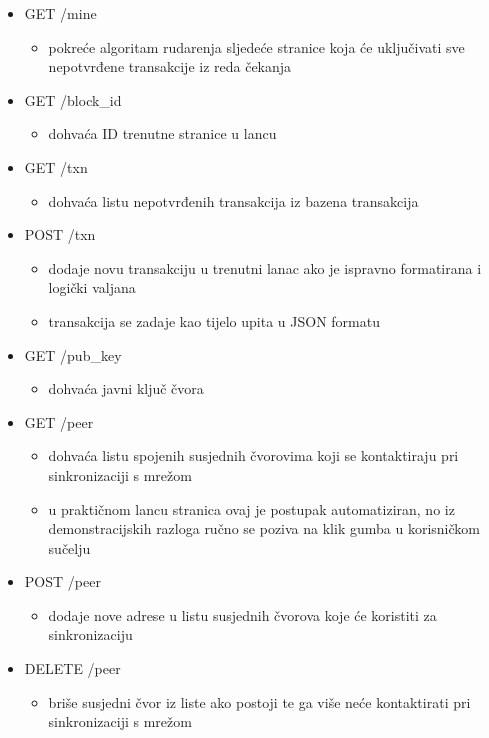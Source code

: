 \documentclass[utf8, zavrsni]{fer}
\begin{document}
\begin{itemize}
	\item GET    /mine
	\begin{itemize}
		\item pokreće algoritam rudarenja sljedeće stranice koja će uključivati sve nepotvrđene transakcije iz reda čekanja
	\end{itemize}
	\item GET    /block\_id
	\begin{itemize}
		\item dohvaća ID trenutne stranice u lancu
	\end{itemize}
	\item GET    /txn
	\begin{itemize}
		\item dohvaća listu nepotvrđenih transakcija iz bazena transakcija
	\end{itemize}
	\item POST   /txn 
	\begin{itemize}
		\item dodaje novu transakciju u trenutni lanac ako je ispravno formatirana i logički valjana
		\item transakcija se zadaje kao tijelo upita u JSON formatu
	\end{itemize}
	\item GET    /pub\_key
	\begin{itemize}
		\item dohvaća javni ključ čvora
	\end{itemize}
	\item GET    /peer
	\begin{itemize}
		\item dohvaća listu spojenih susjednih čvorovima koji se kontaktiraju pri sinkronizaciji s mrežom
		\item u praktičnom lancu stranica ovaj je postupak automatiziran, no iz demonstracijskih razloga ručno se poziva na klik gumba u korisničkom sučelju
	\end{itemize}
	\item POST   /peer
	\begin{itemize}
		\item dodaje nove adrese u listu susjednih čvorova koje će koristiti za sinkronizaciju
	\end{itemize}
	\item DELETE /peer
	\begin{itemize}
		\item briše susjedni čvor iz liste ako postoji te ga više neće kontaktirati pri sinkronizaciji s mrežom

\end{itemize}
\end{itemize}
\end{document}

